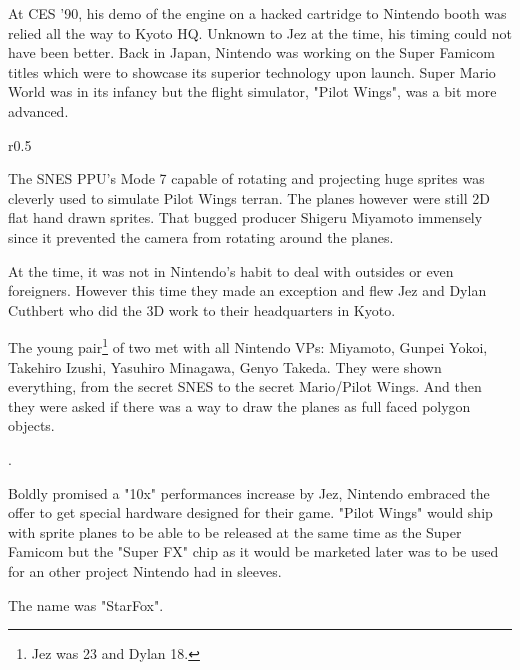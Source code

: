 At CES '90, his demo of the engine on a hacked cartridge to Nintendo booth was relied all the way to Kyoto HQ. Unknown to Jez at the time, his timing could not have been better. Back in Japan, Nintendo was working on the Super Famicom titles which were to showcase its superior technology upon launch. Super Mario World was in its infancy but the flight simulator, "Pilot Wings", was a bit more advanced.\\ 
\par
\begin{wrapfigure}[14]{r}{0.5\textwidth}{
\centering {}}
\end{wrapfigure}
The SNES PPU's Mode 7 capable of rotating and projecting huge sprites was cleverly used to simulate Pilot Wings terran. The planes however were still 2D flat hand drawn sprites. That bugged producer Shigeru Miyamoto immensely since it prevented the camera from rotating around the planes.\\
\par
At the time, it was not in Nintendo's habit to deal with outsides or even foreigners. However this time they made an exception and flew Jez and Dylan Cuthbert who did the 3D work to their headquarters in Kyoto.\\
\par
 The young pair\footnote{Jez was 23 and Dylan 18.} of two met with all Nintendo VPs: Miyamoto, Gunpei Yokoi, Takehiro Izushi, Yasuhiro Minagawa, Genyo Takeda. They were shown everything, from the secret SNES to the secret Mario/Pilot Wings. And then they were asked if there was a way to draw the planes as full faced polygon objects.\\
\par
{}.\\
\par

Boldly promised a "10x" performances increase by Jez, Nintendo embraced the offer to get special hardware designed for their game. "Pilot Wings" would ship with sprite planes to be able to be released at the same time as the Super Famicom but the "Super FX" chip as it would be marketed later was to be used for an other project Nintendo had in sleeves.\\
\par
The name was "StarFox".


